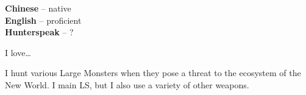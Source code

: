 
\begin{minipage}[t]{0.2\textwidth}
	\vspace{-\baselineskip} %

	
    \textbf{Chinese} -- native\\
	\textbf{English} -- proficient\\
	\textbf{Hunterspeak} -- ?
\end{minipage}
\hfill
\begin{minipage}[t]{0.3\textwidth}
	\vspace{-\baselineskip} %
	
	
    I love\ldots~\lorem%
\end{minipage}
\hfill
\begin{minipage}[t]{0.4\textwidth}
	\vspace{-\baselineskip} %
	
    
    I hunt various Large Monsters when they pose a threat to the ecosystem of the New World. I main LS, but I also use a variety of other weapons.%
\end{minipage}


